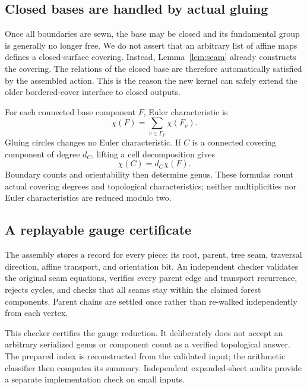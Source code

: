 \documentclass[11pt,a4paper]{article}
\theoremstyle{definition}\newtheorem{definition}[theorem]{Definition}
\theoremstyle{remark}\newtheorem{remark}[theorem]{Remark}
\begin{document}
\subsection{Closed bases are handled by actual gluing}

Once all boundaries are sewn, the base may be closed and its fundamental
group is generally no longer free. We do not assert that an arbitrary list
of affine maps defines a closed-surface covering. Instead, Lemma~\ref{lem:seam}
already constructs the covering. The relations of the closed base are
therefore automatically satisfied by the assembled action. This is the
reason the new kernel can safely extend the older bordered-cover interface
to closed outputs.

For each connected base component $F$, Euler characteristic is
\begin{equation}\label{eq:basechi}
 \chi(F)=\sum_{v\in\Gamma_F}\chi(F_v).
\end{equation}
Gluing circles changes no Euler characteristic. If $C$ is a connected
covering component of degree $d_C$, lifting a cell decomposition gives
\begin{equation}\label{eq:coverchi}
 \chi(C)=d_C\chi(F).
\end{equation}
Boundary counts and orientability then determine genus. These formulas
count actual covering degrees and topological characteristics; neither
multiplicities nor Euler characteristics are reduced modulo two.

\subsection{A replayable gauge certificate}

The assembly stores a record for every piece: its root, parent, tree seam,
traversal direction, affine transport, and orientation bit. An independent
checker validates the original seam equations, verifies every parent edge
and transport recurrence, rejects cycles, and checks that all seams stay
within the claimed forest components. Parent chains are settled once rather
than re-walked independently from each vertex.

This checker certifies the gauge reduction. It deliberately does not accept
an arbitrary serialized genus or component count as a verified topological
answer. The prepared index is reconstructed from the validated input; the
arithmetic classifier then computes its summary. Independent expanded-sheet
audits provide a separate implementation check on small inputs.
\end{document}
